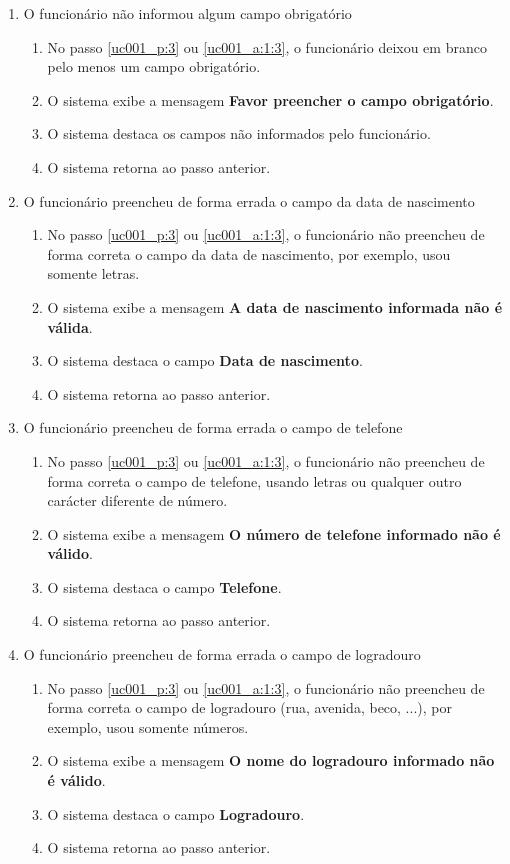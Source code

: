 \begin{enumerate}[label=E\arabic*]
	\item O funcionário não informou algum campo obrigatório \label{uc001_e:1}
	\begin{enumerate}[label*=.\arabic*]
		\item[] No passo \ref{uc001_p:3} ou \ref{uc001_a:1:3}, o funcionário deixou em branco pelo menos um campo obrigatório.
		\item O sistema exibe a mensagem \textbf{Favor preencher o campo obrigatório}.
		\item O sistema destaca os campos não informados pelo funcionário.
		\item O sistema retorna ao passo anterior.
	\end{enumerate}

	\item O funcionário preencheu de forma errada o campo da data de nascimento \label{uc001_e:2}
	\begin{enumerate}[label*=.\arabic*]
			\item[] No passo \ref{uc001_p:3} ou \ref{uc001_a:1:3}, o funcionário não preencheu de forma correta o campo da data de nascimento, por exemplo, usou somente letras.				
		\item O sistema exibe a mensagem \textbf{A data de nascimento informada não é válida}.
		\item O sistema destaca o campo \textbf{Data de nascimento}.
		\item O sistema retorna ao passo anterior.
	\end{enumerate}

	\item O funcionário preencheu de forma errada o campo de telefone \label{uc001_e:3}
	\begin{enumerate}[label*=.\arabic*]		
		\item[] No passo \ref{uc001_p:3} ou \ref{uc001_a:1:3}, o funcionário não preencheu de forma correta o campo de telefone, usando letras ou qualquer outro carácter diferente de número.		
		\item O sistema exibe a mensagem \textbf{O número de telefone informado não é válido}.
		\item O sistema destaca o campo \textbf{Telefone}.
		\item O sistema retorna ao passo anterior.
	\end{enumerate}

	\item O funcionário preencheu de forma errada o campo de logradouro \label{uc001_e:4}
	\begin{enumerate}[label*=.\arabic*]		
		\item[] No passo \ref{uc001_p:3} ou \ref{uc001_a:1:3}, o funcionário não preencheu de forma correta o campo de logradouro (rua, avenida, beco, ...), por exemplo, usou somente números.		
		\item O sistema exibe a mensagem \textbf{O nome do logradouro informado não é válido}.
		\item O sistema destaca o campo \textbf{Logradouro}.
		\item O sistema retorna ao passo anterior.
	\end{enumerate}


\end{enumerate}
